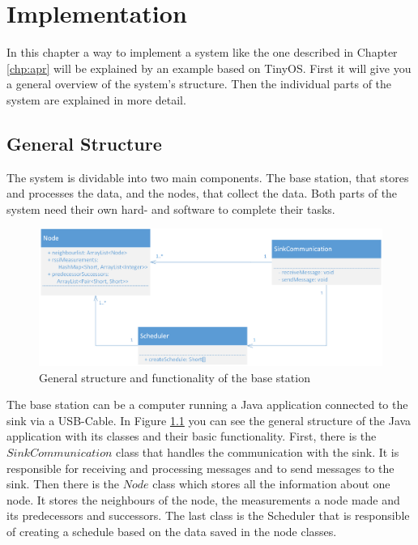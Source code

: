 \chapter{Implementation}
\label{chp:imp}

In this chapter a way to implement a system like the one described in Chapter \ref{chp:apr} will be explained by an example based on TinyOS. First it will give you a general overview of the system's structure. Then the individual parts of the system are explained in more detail.    

\section{General Structure}
\label{chp:imp_general}
The system is dividable into two main components. The base station, that stores and processes the data, and the nodes, that collect the data. Both parts of the system need their own hard- and software to complete their tasks.  

\begin{figure}[htbp]
	\centering
    \includegraphics[scale=0.7]{content/images/BaseStation/Klassendiagram}
   	\caption{General structure and functionality of the base station}
    \label{fig:bsKlassen}
\end{figure}

The base station can be a computer running a Java application connected to the sink via a USB-Cable. In Figure \ref{fig:bsKlassen} you can see the general structure of the Java application with its classes and their basic functionality. First, there is the $SinkCommunication$ class that handles the communication with the sink. It is responsible for receiving and processing messages and to send messages to the sink. Then there is the $Node$ class which stores all the information about one node. It stores the neighbours of the node, the measurements a node made and its predecessors and successors. The last class is the Scheduler that is responsible of creating a schedule based on the data saved in the node classes.  

